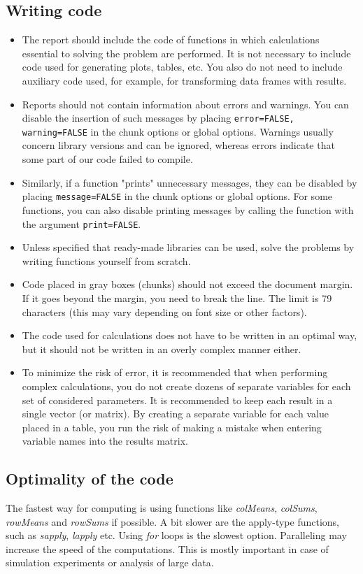 \documentclass[12pt, a4paper]{article}\usepackage[]{graphicx}\usepackage[]{xcolor}
\begin{document}
\subsection{Writing code}
\begin{itemize}
    \item The report should include the code of functions in which calculations essential to solving the problem are performed. It is not necessary to include code used for generating plots, tables, etc. You also do not need to include auxiliary code used, for example, for transforming data frames with results.
    \item Reports should not contain information about errors and warnings. You can disable the insertion of such messages by placing \texttt{error=FALSE, warning=FALSE} in the chunk options or global options. Warnings usually concern library versions and can be ignored, whereas errors indicate that some part of our code failed to compile.
    \item Similarly, if a function "prints" unnecessary messages, they can be disabled by placing \texttt{message=FALSE} in the chunk options or global options. For some functions, you can also disable printing messages by calling the function with the argument \texttt{print=FALSE}.
    \item Unless specified that ready-made libraries can be used, solve the problems by writing functions yourself from scratch.
    \item Code placed in gray boxes (chunks) should not exceed the document margin. If it goes beyond the margin, you need to break the line. The limit is 79 characters (this may vary depending on font size or other factors).
    \item The code used for calculations does not have to be written in an optimal way, but it should not be written in an overly complex manner either.
    \item To minimize the risk of error, it is recommended that when performing complex calculations, you do not create dozens of separate variables for each set of considered parameters. It is recommended to keep each result in a single vector (or matrix). By creating a separate variable for each value placed in a table, you run the risk of making a mistake when entering variable names into the results matrix.
\end{itemize}

\subsection{Optimality of the code}
The fastest way for computing is using functions like \textit{colMeans}, \textit{colSums}, \textit{rowMeans} and \textit{rowSums} if possible. A bit slower are the apply-type functions, such as \textit{sapply}, \textit{lapply} etc. Using \textit{for} loops is the slowest option. Paralleling may increase the speed of the computations.
This is mostly important in case of simulation experiments or analysis of large data.
\end{document}
